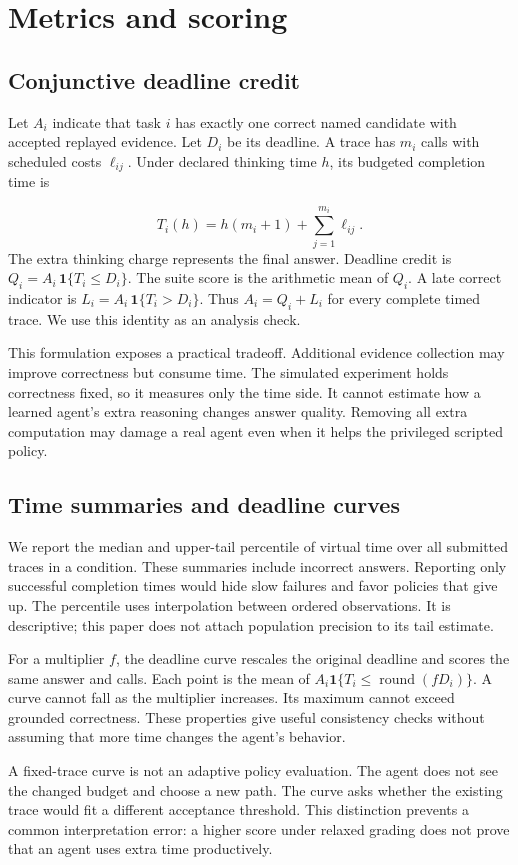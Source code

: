 \documentclass{article}
\begin{document}
\section{Metrics and scoring}
\subsection{Conjunctive deadline credit}
Let $A_i$ indicate that task $i$ has exactly one correct named candidate with accepted replayed evidence. Let $D_i$ be its deadline. A trace has $m_i$ calls with scheduled costs $\ell_{ij}$. Under declared thinking time $h$, its budgeted completion time is\par
\begin{equation} T_i(h)=h(m_i+1)+\sum_{j=1}^{m_i}\ell_{ij}. \end{equation}
The extra thinking charge represents the final answer. Deadline credit is $Q_i=A_i\,\mathbf{1}\{T_i\leq D_i\}$. The suite score is the arithmetic mean of $Q_i$. A late correct indicator is $L_i=A_i\,\mathbf{1}\{T_i>D_i\}$. Thus $A_i=Q_i+L_i$ for every complete timed trace. We use this identity as an analysis check.\par
This formulation exposes a practical tradeoff. Additional evidence collection may improve correctness but consume time. The simulated experiment holds correctness fixed, so it measures only the time side. It cannot estimate how a learned agent's extra reasoning changes answer quality. Removing all extra computation may damage a real agent even when it helps the privileged scripted policy.\par
\subsection{Time summaries and deadline curves}
We report the median and upper-tail percentile of virtual time over all submitted traces in a condition. These summaries include incorrect answers. Reporting only successful completion times would hide slow failures and favor policies that give up. The percentile uses interpolation between ordered observations. It is descriptive; this paper does not attach population precision to its tail estimate.\par
For a multiplier $f$, the deadline curve rescales the original deadline and scores the same answer and calls. Each point is the mean of $A_i\mathbf{1}\{T_i\leq\operatorname{round}(fD_i)\}$. A curve cannot fall as the multiplier increases. Its maximum cannot exceed grounded correctness. These properties give useful consistency checks without assuming that more time changes the agent's behavior.\par
A fixed-trace curve is not an adaptive policy evaluation. The agent does not see the changed budget and choose a new path. The curve asks whether the existing trace would fit a different acceptance threshold. This distinction prevents a common interpretation error: a higher score under relaxed grading does not prove that an agent uses extra time productively.\par
\end{document}
